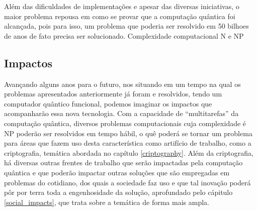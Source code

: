 Além das dificuldades de implementações e apesar das diversas iniciativas, o maior problema repousa em como se provar que a computação quântica foi alcançada, pois para isso, um problema que poderia ser resolvido em 50 bilhoes de anos de fato precisa ser solucionado.
Complexidade computacional N e NP

\subsection{Impactos}
Avançando alguns anos para o futuro, nos situando em um tempo na qual os problemas apresentados anteriormente já foram e resolvidos, tendo um computador quântico funcional, podemos imaginar os impactos que acompanharão essa nova tecnologia. Com a capacidade de “multitarefas” da computação quântica, diversos problemas computacionais cuja complexidade é NP poderão ser resolvidos em tempo hábil, o quê poderá se tornar um problema para áreas que fazem uso desta característica como artifício de trabalho, como a criptografia, temática abordada no capítulo \ref{criptography}.
Além da criptografia, há diversas outras frentes de trabalho que serão impactadas pela computação quântica e que poderão impactar outras soluções que são empregadas em problemas do cotidiano, dos quais a sociedade faz uso e que tal inovação poderá pôr por terra toda a engenhosidade da solução, aprofundado pelo cápitulo \ref{social_impacts}, que trata sobre a temática de forma mais ampla.


\newpage